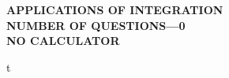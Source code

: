 \documentclass[letterstyle,12pt]{extarticle}
\newcounter{qcounter}
\newcommand{\ques}[1]{\begin{minipage}{0.9 \textwidth} \item #1 \end{minipage} \vspace{4ex}}
\begin{document}
\begin{center}
    {\bf
    \MakeUppercase{Applications of Integration\\[1ex]
    NUMBER OF QUESTIONS—0 \\[1ex] 
    NO CALCULATOR \\[5ex]
    }}
\end{center}

\begin{list}{\textbf{.}~}{}
\setlength\itemsep{3em}

\ques{
t
}

\end{list}

\clearpage 

\twocolumn

\begin{supertabular}{ll}

\end{supertabular}
\end{document}
